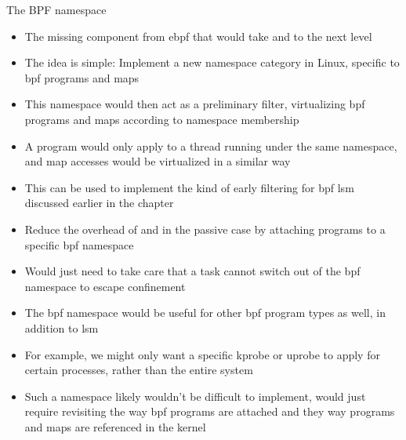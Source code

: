 \begin{inprogress}
  The BPF namespace
  \begin{itemize}
    \item The missing component from \gls{ebpf} that would take \bpfbox{} and \bpfcontain{} to the next level
    \item The idea is simple: Implement a new namespace category in Linux, specific to \gls{bpf} programs and maps
    \item This namespace would then act as a preliminary filter, virtualizing \gls{bpf} programs and maps according to namespace membership
    \item A program would only apply to a thread running under the same namespace, and map accesses would be virtualized in a similar way
    \item This can be used to implement the kind of early filtering for \gls{bpf} \gls{lsm} discussed earlier in the chapter
    \item Reduce the overhead of \bpfbox{} and \bpfcontain{} in the passive case by attaching programs to a specific \gls{bpf} namespace
    \item Would just need to take care that a task cannot switch out of the \gls{bpf} namespace to escape confinement

    \item The \gls{bpf} namespace would be useful for other \gls{bpf} program types as well, in addition to \gls{lsm}
    \item For example, we might only want a specific kprobe or uprobe to apply for certain processes, rather than the entire system
    \item Such a namespace likely wouldn't be difficult to implement, would just require
    revisiting the way \gls{bpf} programs are attached and they way programs and maps are
    referenced in the kernel
  \end{itemize}


\end{inprogress}

